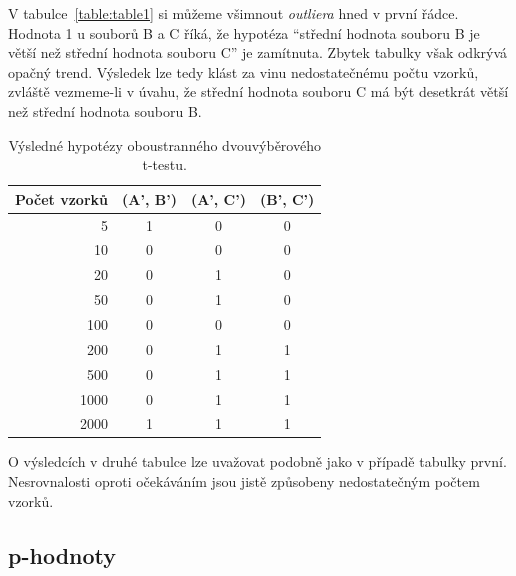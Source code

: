 V tabulce~\ref{table:table1} si můžeme všimnout \textit{outliera} hned v první řádce.
Hodnota 1 u souborů B a C říká, že hypotéza \enquote{střední hodnota souboru B je větší než střední hodnota souboru C} je zamítnuta.
Zbytek tabulky však odkrývá opačný trend.
Výsledek lze tedy klást za vinu nedostatečnému počtu vzorků, zvláště vezmeme-li v úvahu, že střední hodnota souboru C má být desetkrát větší než střední hodnota souboru B.

\begin{table}[htb]
    \centering

    \begin{tabular}{rccc}
        \toprule

        Počet vzorků    & (A', B')  & (A', C') & (B', C')   \\ \midrule
           5            & 1         & 0        & 0          \\
          10            & 0         & 0        & 0          \\
          20            & 0         & 1        & 0          \\
          50            & 0         & 1        & 0          \\
         100            & 0         & 0        & 0          \\
         200            & 0         & 1        & 1          \\
         500            & 0         & 1        & 1          \\
        1000            & 0         & 1        & 1          \\
        2000            & 1         & 1        & 1          \\

        \bottomrule
    \end{tabular}

    \caption{Výsledné hypotézy oboustranného dvouvýběrového t-testu.}
    \label{table:table2}
\end{table}
\FloatBarrier

O výsledcích v druhé tabulce lze uvažovat podobně jako v případě tabulky první.
Nesrovnalosti oproti očekáváním jsou jistě způsobeny nedostatečným počtem vzorků.

\subsection{p-hodnoty}

